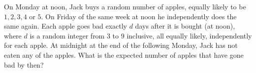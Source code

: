 On Monday at noon, Jack buys a random number of apples, equally likely to be $1,2,3,4$ or $5$. On Friday of the same week at noon he independently does the same again. Each apple goes bad exactly $d$ days after it is bought (at noon), where $d$ is a random integer from $3$ to $9$ inclusive, all equally likely, independently for each apple. At midnight at the end of the following Monday, Jack has not eaten any of the apples. What is the expected number of apples that have gone bad by then?
